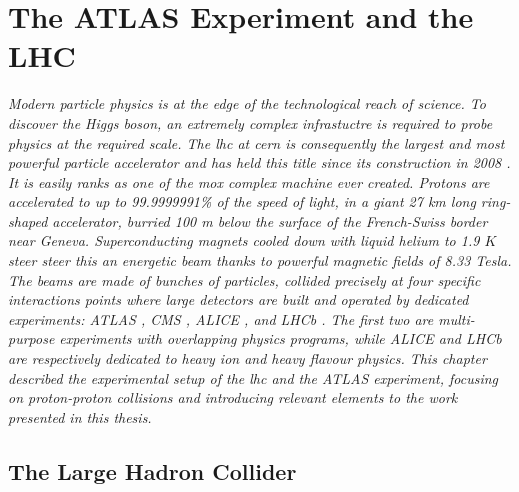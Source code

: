 \chapter{\color{oxfordblue} The ATLAS Experiment and the LHC}\label{chapter-ATLAS}
\ChapFrame

\textit{
Modern particle physics is at the edge of the technological reach of science. To discover the Higgs boson, an extremely complex infrastuctre is required to probe physics at the required scale. The \gls{lhc} at \gls{cern} is consequently the largest and most powerful particle accelerator and has held this title since its construction in 2008 \cite{LyndonEvans_2008}. It is easily ranks as one of the mox complex machine ever created. Protons are accelerated to up to 99.9999991\% of the speed of light, in a giant 27 km long ring-shaped accelerator, burried 100 m below the surface of the French-Swiss border near Geneva. Superconducting magnets cooled down with liquid helium to 1.9 $K$ steer steer this an energetic beam thanks to powerful magnetic fields of 8.33 Tesla. The beams are made of bunches of particles, collided precisely at four specific interactions points where large detectors are built and operated by dedicated experiments: ATLAS \cite{TheATLASCollaboration_2008}, CMS \cite{TheCMSCollaboration_2008}, ALICE \cite{TheALICECollaboration_2008}, and LHCb \cite{TheLHCbCollaboration_2008}. The first two are multi-purpose experiments with overlapping physics programs, while ALICE and LHCb are respectively dedicated to heavy ion and heavy flavour physics. This chapter described the experimental setup of the \gls{lhc} and the ATLAS experiment, focusing on proton-proton collisions and introducing relevant elements to the work presented in this thesis.} 

\section{The Large Hadron Collider}\label{sec-LHC} %

